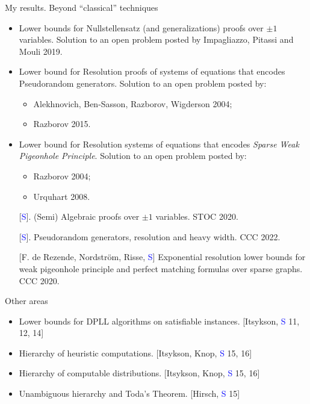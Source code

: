 \begin{frame}{My results. Beyond ``classical'' techniques}
        
    \begin{itemize}
        \item Lower bounds for Nullstellensatz (and generalizations) proofs over $\pm 1$
            variables. Solution to an open problem posted by Impagliazzo, Pitassi and Mouli 2019.
        \pause
        \item Lower bound for Resolution proofs of systems of equations that encodes Pseudorandom
            generators. Solution to an open problem posted by:
            \begin{itemize}
                \item Alekhnovich, Ben-Sasson, Razborov, Wigderson 2004;
                \item Razborov 2015.
            \end{itemize}
        \pause
        \item Lower bound for Resolution systems of equations that encodes \textit{Sparse Weak Pigeonhole
            Principle}. Solution to an open problem posted by:
            \begin{itemize}
                \item Razborov 2004;
                \item Urquhart 2008.
            \end{itemize}
    \end{itemize}

    \begin{enumerate}
        \item[] [\textcolor{blue}{S}]. (Semi) Algebraic proofs over $\pm 1$ variables. STOC 2020.
        \item[] [\textcolor{blue}{S}]. Pseudorandom generators, resolution and
            heavy width. CCC 2022.
        \item[] [F. de Rezende, Nordstr{\"{o}}m, Risse, \textcolor{blue}{S}] Exponential resolution lower
            bounds for weak pigeonhole principle and perfect matching formulas over sparse graphs. CCC
            2020.
    \end{enumerate}
\end{frame}

\begin{frame}{Other areas}

    \begin{itemize}
        \item Lower bounds for DPLL algorithms on satisfiable instances. [Itsykson, \textcolor{blue}{S} 11, 12, 14]
        \item Hierarchy of heuristic computations. [Itsykson, Knop, \textcolor{blue}{S} 15, 16]
        \item Hierarchy of computable distributions. [Itsykson, Knop, \textcolor{blue}{S} 15, 16]
        \item Unambiguous hierarchy and Toda's Theorem. [Hirsch, \textcolor{blue}{S} 15]
    \end{itemize}
    
\end{frame}


